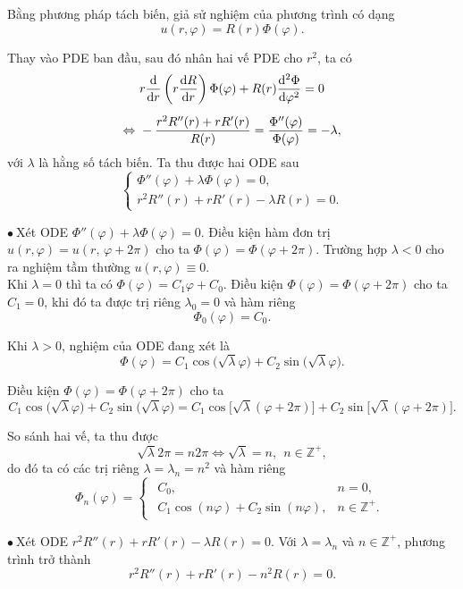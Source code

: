 \documentclass[10pt, a4paper]{article}
\begin{document}
	Bằng phương pháp tách biến, giả sử nghiệm của phương trình có dạng $$u(r,\varphi)=R(r)\Phi(\varphi).$$
	
	Thay vào PDE ban đầu, sau đó nhân hai vế PDE cho $r^2$, ta có \begin{align*}
		&r\frac{\mathrm d}{\mathrm dr}\left(r\dfrac{\mathrm dR}{\mathrm dr}\right)\Phi(\varphi)+R(r)\frac{\mathrm d^2\Phi}{\mathrm d\varphi^2}=0\\
		\noalign{\vskip5pt}
		\Leftrightarrow~&-\frac{r^2R''(r)+rR'(r)}{R(r)}=\frac{\Phi''(\varphi)}{\Phi(\varphi)}=-\lambda,
	\end{align*}
	với $\lambda$ là hằng số tách biến. Ta thu được hai ODE sau $$\begin{cases}
		\Phi''(\varphi)+\lambda\Phi(\varphi)=0,\\
		r^2R''(r)+rR'(r)-\lambda R(r)=0.
	\end{cases}$$
	
	$\bullet~$Xét ODE $\Phi''(\varphi)+\lambda\Phi(\varphi)=0$. Điều kiện hàm đơn trị $u(r,\varphi)=u(r,\,\varphi+2\pi)$ cho ta $\Phi(\varphi)=\Phi(\varphi+2\pi)$. Trường hợp $\lambda<0$ cho ra nghiệm tầm thường $u(r,\varphi)\equiv0$.\\
	
	Khi $\lambda=0$ thì ta có $\Phi(\varphi)=C_1\varphi+C_0$. Điều kiện $\Phi(\varphi)=\Phi(\varphi+2\pi)$ cho ta $C_1=0$, khi đó ta được trị riêng $\lambda_0=0$ và hàm riêng $$\Phi_0(\varphi)=C_0.$$
	
	Khi $\lambda>0$, nghiệm của ODE đang xét là $$\Phi(\varphi)=C_1\cos\big(\sqrt\lambda\varphi\big)+C_2\sin\big(\sqrt\lambda\varphi\big).$$
	
	Điều kiện $\Phi(\varphi)=\Phi(\varphi+2\pi)$ cho ta $$C_1\cos\big(\sqrt\lambda\varphi\big)+C_2\sin\big(\sqrt\lambda\varphi\big)=C_1\cos\big[\sqrt\lambda(\varphi+2\pi)\big]+C_2\sin\big[\sqrt\lambda(\varphi+2\pi)\big].$$
	
	So sánh hai vế, ta thu được $$\sqrt\lambda2\pi=n2\pi\iff\sqrt\lambda=n,~~n\in\mathbb Z^+,$$
	do đó ta có các trị riêng $\lambda=\lambda_n=n^2$ và hàm riêng $$\Phi_n(\varphi)=\begin{cases}
		\begin{array}{ll}
			C_0, & n=0, \\
			C_1\cos(n\varphi)+C_2\sin(n\varphi), & n\in\mathbb Z^+.
		\end{array}
	\end{cases}$$
	
	$\bullet~$Xét ODE $r^2R''(r)+rR'(r)-\lambda R(r)=0.$ Với $\lambda=\lambda_n$ và $n\in\mathbb Z^+$, phương trình trở thành $$r^2R''(r)+rR'(r)-n^2R(r)=0.$$
	
\end{document}

